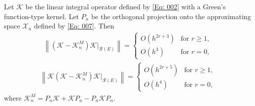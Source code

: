 \documentclass[10pt,a4paper]{amsart}
\newcommand{\norm}[1]{\left\lVert #1\right\rVert}
\begin{document}
\begin{lemma} \label{lem2}
	Let $ \mathcal{K}$ be the linear integral operator defined by \eqref{Eq: 002} with a Green's function-type kernel. Let $P_n$ be the orthogonal projection onto the approximating space $\mathcal{X}_n$ defined by \eqref{Eq: 007}. Then
	\begin{eqnarray*}
		\norm{(\mathcal{K} - \mathcal{K}_n^M) \mathcal{K} |_{\mathcal{R}(E)}} =
		\begin{cases}
			O\left(h^{2r+3} \right) & \text{for } r \geq 1, \\
			O\left(h^{3} \right) & \text{for } r = 0,
		\end{cases}
	\end{eqnarray*}
	\begin{eqnarray*}
		\norm{\mathcal{K} (\mathcal{K} - \mathcal{K}_n^M) \mathcal{K} |_{\mathcal{R}(E)}} =
		\begin{cases}
			O\left(h^{2r+5} \right) & \text{for } r \geq 1, \\
			O\left(h^{4} \right) & \text{for } r = 0,
		\end{cases}
	\end{eqnarray*}
	where $\mathcal{K}_n^M= P_n \mathcal{K} + \mathcal{K} P_n - P_n \mathcal{K} P_n.$
\end{lemma}
\end{document}
